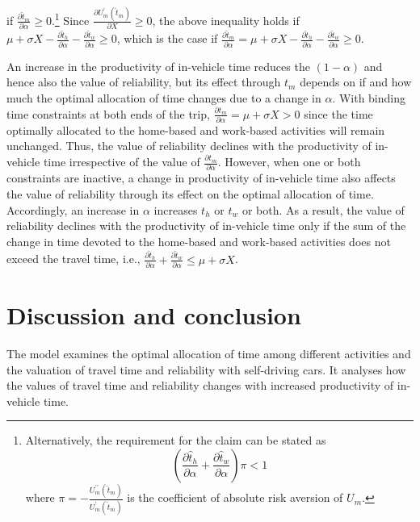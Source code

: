 \documentclass[12pt,a4paper,british]{article}
\makeatletter
\newenvironment{proof}[1][\proofname]{\par
    \normalfont\topsep6\p@\@plus6\p@\relax
    \trivlist
    \itemindent\parindent
    \item[\hskip\labelsep
          \scshape
      #1]\ignorespaces
  }{%
    \endtrivlist\@endpefalse
  }
\providecommand{\proofname}{Proof}
\makeatother
\begin{document}
\begin{proof}
\begin{align*}
\end{align*}
if $\frac{\partial\hat{t}_{m}}{\partial\alpha}\geq0$.\footnote{Alternatively, the requirement for the claim can be stated as%
\begin{equation*}
\left(\frac{\partial\hat{t}_{h}}{\partial\alpha}+\frac{\partial\hat{t}_{w}}{\partial\alpha}\right)\pi<1
\end{equation*}%
where $\pi=-\frac{U_{m}^{\prime\prime}\left(\hat{t}_{m}\right)}{U_{m}^{\prime}\left(\hat{t}_{m}\right)}$ is the coefficient of absolute risk aversion of $U_{m}$.} Since $\frac{\partial U_{m}^{\prime}\left(\hat{t}_{m}\right)}{\partial X}\geq0$, the above inequality holds if $\mu+\sigma X-\frac{\partial\hat{t}_{h}}{\partial\alpha}-\frac{\partial\hat{t}_{w}}{\partial\alpha}\geq0$, which is the case if $\frac{\partial\hat{t}_{m}}{\partial\alpha}=\mu+\sigma X-\frac{\partial\hat{t}_{h}}{\partial\alpha}-\frac{\partial\hat{t}_{w}}{\partial\alpha}\geq0$.
\end{proof}

An increase in the productivity of in-vehicle time reduces the $\left(1-\alpha\right)$ and hence also the value of reliability, but its effect through $t_{m}$ depends on if and how much the optimal allocation of time changes due to a change in $\alpha$. With binding time constraints at both ends of the trip, $\frac{\partial t_{m}}{\partial\alpha}=\mu+\sigma X>0$ since the time optimally allocated to the home-based and work-based activities will remain unchanged. Thus, the value of reliability declines with the productivity of in-vehicle time irrespective of the value of $\frac{\partial t_{m}}{\partial\alpha}$. However, when one or both constraints are inactive, a change in productivity of in-vehicle time also affects the value of reliability through its effect on the optimal allocation of time. Accordingly, an increase in $\alpha$ increases $t_{h}$ or $t_{w}$ or both. As a result, the value of reliability declines with the productivity of in-vehicle time only if the sum of the change in time devoted to the home-based and work-based activities does not exceed the travel time, i.e., $\frac{\partial\hat{t}_{h}}{\partial\alpha}+\frac{\partial\hat{t}_{w}}{\partial\alpha}\leq\mu+\sigma X$.


\section{Discussion and conclusion}

The model examines the optimal allocation of time among different activities and the valuation of travel time and reliability with self-driving cars. It analyses how the values of travel time and reliability changes with increased productivity of in-vehicle time.

\clearpage



\end{document}
